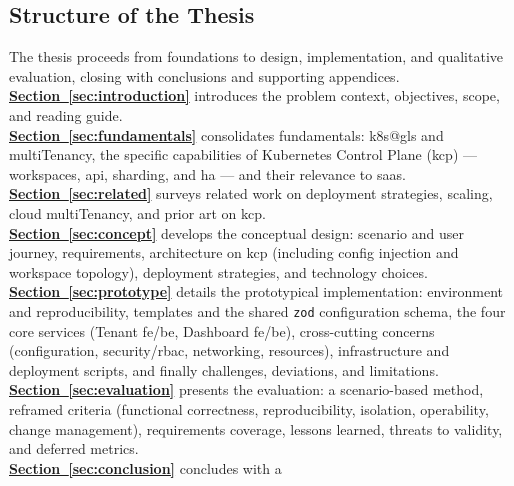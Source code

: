 \documentclass[11pt, a4paper, oneside, listof=totoc]{scrartcl}
\begin{document}
        \subsection{Structure of the Thesis}\label{subsec:structure}
            The thesis proceeds from foundations to design, implementation, and qualitative
            evaluation, closing with conclusions and supporting appendices.\\
            \textbf{\hyperref[sec:introduction]{Section~\ref*{sec:introduction}}} introduces the
            problem context, objectives, scope, and reading guide.\\
            \textbf{\hyperref[sec:fundamentals]{Section~\ref*{sec:fundamentals}}} consolidates
            fundamentals: \gls{k8s@gls} and \gls{multiTenancy}, the specific capabilities of Kubernetes
            Control Plane (\gls{kcp}) --- workspaces, \gls{api}, sharding, and \gls{ha} --- and
            their relevance to \gls{saas}.\\
            \textbf{\hyperref[sec:related]{Section~\ref*{sec:related}}} surveys related work on
            deployment strategies, scaling, cloud \gls{multiTenancy}, and prior art on \gls{kcp}.\\
            \textbf{\hyperref[sec:concept]{Section~\ref*{sec:concept}}} develops the conceptual
            design: scenario and user journey, requirements, architecture on \gls{kcp} (including
            config injection and workspace topology), deployment strategies, and technology
            choices.\\
            \textbf{\hyperref[sec:prototype]{Section~\ref*{sec:prototype}}} details the prototypical
            implementation: environment and reproducibility, templates and the shared \texttt{zod}
            configuration schema, the four core services (Tenant \gls{fe}/\gls{be}, Dashboard
            \gls{fe}/\gls{be}), cross-cutting concerns (configuration, security/\gls{rbac},
            networking, resources), infrastructure and deployment scripts, and finally challenges,
            deviations, and limitations.\\
            \textbf{\hyperref[sec:evaluation]{Section~\ref*{sec:evaluation}}} presents the
            evaluation: a scenario-based method, reframed criteria (functional correctness,
            reproducibility, isolation, operability, change management), requirements coverage,
            lessons learned, threats to validity, and deferred metrics.\\
            \textbf{\hyperref[sec:conclusion]{Section~\ref*{sec:conclusion}}} concludes with a
\end{document}
